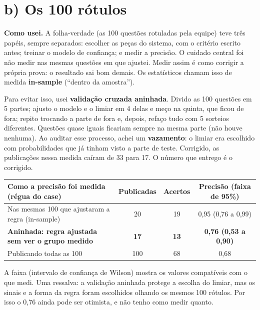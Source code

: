 \documentclass[11pt,a4paper]{article}
\newcommand{\bd}[1]{\textbf{#1}}
\begin{document}
\section{b) Os 100 rótulos}

\bd{Como usei.} A folha-verdade (as 100 questões rotuladas pela equipe) teve três papéis, sempre
separados: escolher as peças do sistema, com o critério escrito antes; treinar o modelo de
confiança; e medir a precisão. O cuidado central foi não medir nas mesmas questões em que ajustei.
Medir assim é como corrigir a própria prova: o resultado sai bom demais. Os estatísticos chamam
isso de medida \bd{in-sample} (``dentro da amostra'').

Para evitar isso, usei \bd{validação cruzada aninhada}. Divido as 100 questões em 5 partes; ajusto
o modelo e o limiar em 4 delas e meço na quinta, que ficou de fora; repito trocando a parte de
fora e, depois, refaço tudo com 5 sorteios diferentes. Questões quase iguais ficariam sempre na
mesma parte (não houve nenhuma). Ao auditar esse processo, achei um \bd{vazamento}: o limiar era
escolhido com probabilidades que já tinham visto a parte de teste. Corrigido, as publicações nessa
medida caíram de 33 para 17. O número que entrego é o corrigido.

\begin{center}
\small
\begin{tabular}{lccc}
\toprule
Como a precisão foi medida (régua do case) & Publicadas & Acertos & Precisão (faixa de 95\%) \\
\midrule
Nas mesmas 100 que ajustaram a regra (in-sample) & 20 & 19 & 0,95 (0,76 a 0,99) \\
\bd{Aninhada: regra ajustada sem ver o grupo medido} & \bd{17} & \bd{13} & \bd{0,76 (0,53 a 0,90)} \\
Publicando todas as 100 & 100 & 68 & 0,68 \\
\bottomrule
\end{tabular}
\end{center}
\vspace{-4pt}
{\small A faixa (intervalo de confiança de Wilson) mostra os valores compatíveis com o que medi.
Uma ressalva: a validação aninhada protege a escolha do limiar, mas os sinais e a forma da regra
foram escolhidos olhando os mesmos 100 rótulos. Por isso o 0,76 ainda pode ser otimista, e não
tenho como medir quanto.}
\end{document}
